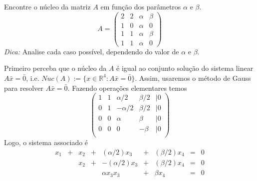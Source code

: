 \documentclass[11pt]{exam}
\begin{document}
\begin{questions}
  \question[20]
  Encontre o núcleo da matriz $A$ em função dos parâmetros $\alpha$ e $\beta$.  
       $$
       A=
       \begin{pmatrix}
       2 & 2 & \alpha & \beta \\
       1 & 0 & \alpha & 0     \\
       1 & 1 & \alpha & \beta \\
       1 & 1 & \alpha & 0     
       \end{pmatrix}
       $$
   {\it Dica:} Analise cada caso possível, dependendo do valor de $\alpha$ e $\beta$.    
      \begin{solution}
      Primeiro perceba que o núcleo da $A$ é igual ao conjunto solução do sistema linear $A\bar{x}=\bar{0}$, i.e. 
      $Nuc(A):=\{x \in \mathbb{R}^{4}: A\bar{x}=\bar{0}\}$. Assim, usaremos 
      o método de Gauss para resolver $A\bar{x}=\bar{0}$. 
      Fazendo operações elementares temos 
         $$
        \begin{pmatrix}
        1 & 1 & \alpha/2 & \beta/2 &|0 \\
        0 & 1 & -\alpha/2& \beta/2 &|0\\
        0 & 0 & \alpha & \beta &|0 \\
        0 & 0 & 0 & -\beta &|0\\
        \end{pmatrix}
       $$ 
       Logo, o sistema associado é 
        $$
       \begin{matrix}
       x_1&+&x_2&+&(\alpha/2) x_3&+&(\beta/2) x_4&=&0\\
          & &x_2&+&-(\alpha/2)x_3&+&(\beta/2) x_4&=&0\\
          & &   & &\alpha x_3 x_3&+&\beta x_4&=&0\\

\end{matrix}$$
\end{solution}
\end{questions}
\end{document}
